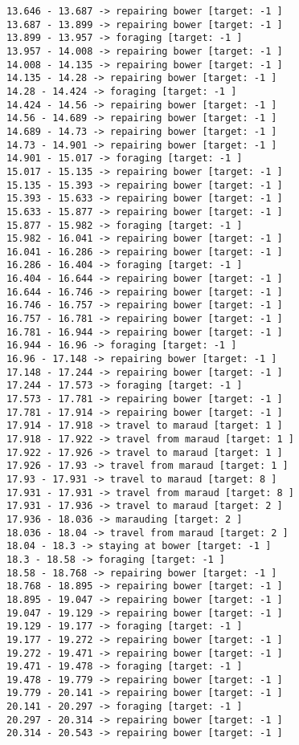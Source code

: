 \documentclass[11pt]{article}
\begin{document}
\begin{Verbatim}[commandchars=\\\{\}]
13.646 - 13.687 -> repairing bower [target: -1 ]
13.687 - 13.899 -> repairing bower [target: -1 ]
13.899 - 13.957 -> foraging [target: -1 ]
13.957 - 14.008 -> repairing bower [target: -1 ]
14.008 - 14.135 -> repairing bower [target: -1 ]
14.135 - 14.28 -> repairing bower [target: -1 ]
14.28 - 14.424 -> foraging [target: -1 ]
14.424 - 14.56 -> repairing bower [target: -1 ]
14.56 - 14.689 -> repairing bower [target: -1 ]
14.689 - 14.73 -> repairing bower [target: -1 ]
14.73 - 14.901 -> repairing bower [target: -1 ]
14.901 - 15.017 -> foraging [target: -1 ]
15.017 - 15.135 -> repairing bower [target: -1 ]
15.135 - 15.393 -> repairing bower [target: -1 ]
15.393 - 15.633 -> repairing bower [target: -1 ]
15.633 - 15.877 -> repairing bower [target: -1 ]
15.877 - 15.982 -> foraging [target: -1 ]
15.982 - 16.041 -> repairing bower [target: -1 ]
16.041 - 16.286 -> repairing bower [target: -1 ]
16.286 - 16.404 -> foraging [target: -1 ]
16.404 - 16.644 -> repairing bower [target: -1 ]
16.644 - 16.746 -> repairing bower [target: -1 ]
16.746 - 16.757 -> repairing bower [target: -1 ]
16.757 - 16.781 -> repairing bower [target: -1 ]
16.781 - 16.944 -> repairing bower [target: -1 ]
16.944 - 16.96 -> foraging [target: -1 ]
16.96 - 17.148 -> repairing bower [target: -1 ]
17.148 - 17.244 -> repairing bower [target: -1 ]
17.244 - 17.573 -> foraging [target: -1 ]
17.573 - 17.781 -> repairing bower [target: -1 ]
17.781 - 17.914 -> repairing bower [target: -1 ]
17.914 - 17.918 -> travel to maraud [target: 1 ]
17.918 - 17.922 -> travel from maraud [target: 1 ]
17.922 - 17.926 -> travel to maraud [target: 1 ]
17.926 - 17.93 -> travel from maraud [target: 1 ]
17.93 - 17.931 -> travel to maraud [target: 8 ]
17.931 - 17.931 -> travel from maraud [target: 8 ]
17.931 - 17.936 -> travel to maraud [target: 2 ]
17.936 - 18.036 -> marauding [target: 2 ]
18.036 - 18.04 -> travel from maraud [target: 2 ]
18.04 - 18.3 -> staying at bower [target: -1 ]
18.3 - 18.58 -> foraging [target: -1 ]
18.58 - 18.768 -> repairing bower [target: -1 ]
18.768 - 18.895 -> repairing bower [target: -1 ]
18.895 - 19.047 -> repairing bower [target: -1 ]
19.047 - 19.129 -> repairing bower [target: -1 ]
19.129 - 19.177 -> foraging [target: -1 ]
19.177 - 19.272 -> repairing bower [target: -1 ]
19.272 - 19.471 -> repairing bower [target: -1 ]
19.471 - 19.478 -> foraging [target: -1 ]
19.478 - 19.779 -> repairing bower [target: -1 ]
19.779 - 20.141 -> repairing bower [target: -1 ]
20.141 - 20.297 -> foraging [target: -1 ]
20.297 - 20.314 -> repairing bower [target: -1 ]
20.314 - 20.543 -> repairing bower [target: -1 ]

\end{Verbatim}
\end{document}
